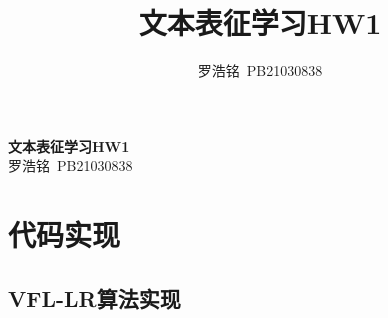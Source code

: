 \documentclass[twoside,11pt]{article}
\title{文本表征学习HW1}
\author{罗浩铭\ PB21030838}
\begin{document}
\fancyhf{} %
\fancyfoot[C]{\thepage} %

\renewcommand{\headrulewidth}{0pt} %

\begin{center}
    \textbf{\LARGE{文本表征学习HW1}}\\
    \vspace{0.1cm}
    \large{罗浩铭\ PB21030838}
\end{center}






\section{代码实现}
\subsection{VFL-LR算法实现}
\end{document}
